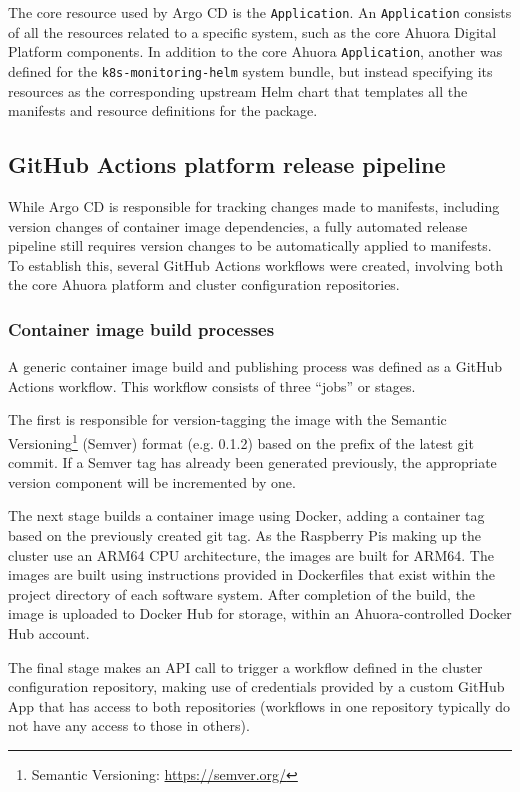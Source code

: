 The core resource used by Argo CD is the \verb|Application|. An \verb|Application| consists of all the resources related to a specific system, such as the core Ahuora Digital Platform components. In addition to the core Ahuora \verb|Application|, another was defined for the \verb|k8s-monitoring-helm| system bundle, but instead specifying its resources as the corresponding upstream Helm chart that templates all the manifests and resource definitions for the package.

\subsection{GitHub Actions platform release pipeline}

While Argo CD is responsible for tracking changes made to manifests, including version changes of container image dependencies, a fully automated release pipeline still requires version changes to be automatically applied to manifests. To establish this, several GitHub Actions workflows were created, involving both the core Ahuora platform and cluster configuration repositories.

\subsubsection{Container image build processes}

A generic container image build and publishing process was defined as a GitHub Actions workflow. This workflow consists of three ``jobs'' or stages. 

The first is responsible for version-tagging the image with the Semantic Versioning\footnote{Semantic Versioning: \url{https://semver.org/}} (Semver) format (e.g. 0.1.2) based on the prefix of the latest git commit. If a Semver tag has already been generated previously, the appropriate version component will be incremented by one.

The next stage builds a container image using Docker, adding a container tag based on the previously created git tag. As the Raspberry Pis making up the cluster use an ARM64 CPU architecture, the images are built for ARM64. The images are built using instructions provided in Dockerfiles that exist within the project directory of each software system. After completion of the build, the image is uploaded to Docker Hub for storage, within an Ahuora-controlled Docker Hub account.

The final stage makes an API call to trigger a workflow defined in the cluster configuration repository, making use of credentials provided by a custom GitHub App that has access to both repositories (workflows in one repository typically do not have any access to those in others).

